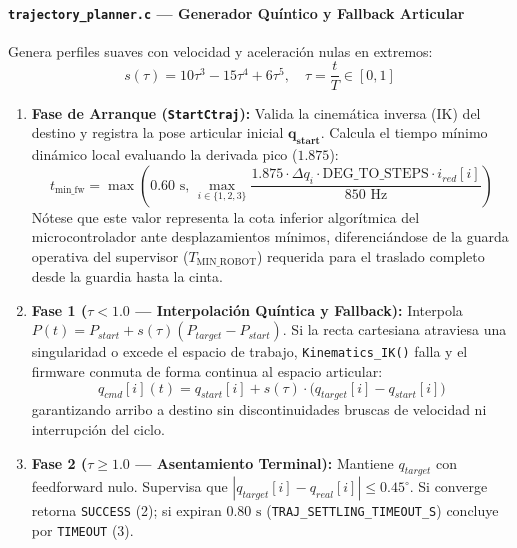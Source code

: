 \documentclass[12pt, a4paper]{report}
\begin{document}
\paragraph{\texttt{trajectory\_planner.c} --- Generador Quíntico y Fallback Articular}
Genera perfiles suaves con velocidad y aceleración nulas en extremos:
\begin{equation}
    s(\tau) = 10\tau^3 - 15\tau^4 + 6\tau^5, \quad \tau = \frac{t}{T} \in [0, 1]
\end{equation}
\begin{enumerate}
    \item \textbf{Fase de Arranque (\texttt{StartCtraj}):}
    Valida la cinemática inversa (IK) del destino y registra la pose articular inicial $\mathbf{q_{start}}$. Calcula el tiempo mínimo dinámico local evaluando la derivada pico ($1.875$):
    \begin{equation}
        t_{\text{min\_fw}} = \max\left(0.60\text{ s}, \, \max_{i \in \{1,2,3\}} \frac{1.875 \cdot \Delta q_i \cdot \text{DEG\_TO\_STEPS} \cdot i_{red}[i]}{850\text{ Hz}}\right)
    \end{equation}
    Nótese que este valor representa la cota inferior algorítmica del microcontrolador ante desplazamientos mínimos, diferenciándose de la guarda operativa del supervisor ($T_{\text{MIN\_ROBOT}}$) requerida para el traslado completo desde la guardia hasta la cinta.
    \item \textbf{Fase 1 ($\tau < 1.0$ --- Interpolación Quíntica y Fallback):}
    Interpola $P(t) = P_{start} + s(\tau)(P_{target} - P_{start})$. Si la recta cartesiana atraviesa una singularidad o excede el espacio de trabajo, \texttt{Kinematics\_IK()} falla y el firmware conmuta de forma continua al espacio articular:
    \begin{equation}
        q_{cmd}[i](t) = q_{start}[i] + s(\tau) \cdot \big(q_{target}[i] - q_{start}[i]\big)
    \end{equation}
    garantizando arribo a destino sin discontinuidades bruscas de velocidad ni interrupción del ciclo.
    \item \textbf{Fase 2 ($\tau \ge 1.0$ --- Asentamiento Terminal):}
    Mantiene $q_{target}$ con feedforward nulo. Supervisa que $|q_{target}[i] - q_{real}[i]| \le 0.45^\circ$. Si converge retorna \texttt{SUCCESS} (2); si expiran $0.80\text{ s}$ (\texttt{TRAJ\_SETTLING\_TIMEOUT\_S}) concluye por \texttt{TIMEOUT} (3).
\end{enumerate}
\end{document}
